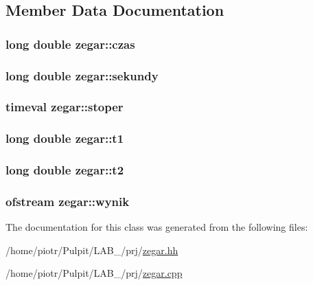 \subsection{\-Member \-Data \-Documentation}
\hypertarget{classzegar_a2249608c9a5286bba25e22a8d607dc5c}{
\subsubsection[{czas}]{\setlength{\rightskip}{0pt plus 5cm}long double {\bf zegar\-::czas}}}\label{classzegar_a2249608c9a5286bba25e22a8d607dc5c}
\hypertarget{classzegar_ae51c387a5599badba9221824ae75b1de}{
\subsubsection[{sekundy}]{\setlength{\rightskip}{0pt plus 5cm}long double {\bf zegar\-::sekundy}}}\label{classzegar_ae51c387a5599badba9221824ae75b1de}
\hypertarget{classzegar_a4c16d3b27f74dc7760b8a23269a20a7b}{
\subsubsection[{stoper}]{\setlength{\rightskip}{0pt plus 5cm}timeval {\bf zegar\-::stoper}}}\label{classzegar_a4c16d3b27f74dc7760b8a23269a20a7b}
\hypertarget{classzegar_aafb4ae592701809482f334fb0d3e55bf}{
\subsubsection[{t1}]{\setlength{\rightskip}{0pt plus 5cm}long double {\bf zegar\-::t1}}}\label{classzegar_aafb4ae592701809482f334fb0d3e55bf}
\hypertarget{classzegar_ac32f1b83ea11b875ba4356afba430581}{
\subsubsection[{t2}]{\setlength{\rightskip}{0pt plus 5cm}long double {\bf zegar\-::t2}}}\label{classzegar_ac32f1b83ea11b875ba4356afba430581}
\hypertarget{classzegar_ab52ebd6c7d2692754d05935d9b777be9}{
\subsubsection[{wynik}]{\setlength{\rightskip}{0pt plus 5cm}ofstream {\bf zegar\-::wynik}}}\label{classzegar_ab52ebd6c7d2692754d05935d9b777be9}


\-The documentation for this class was generated from the following files\-:\begin{DoxyCompactItemize}
\item 
/home/piotr/\-Pulpit/\-L\-A\-B\-\_/prj/\hyperlink{zegar_8hh}{zegar.\-hh}\item 
/home/piotr/\-Pulpit/\-L\-A\-B\-\_/prj/\hyperlink{zegar_8cpp}{zegar.\-cpp}\end{DoxyCompactItemize}
